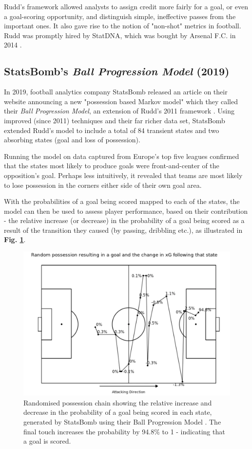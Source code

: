 \documentclass{l4proj}
\begin{document}
Rudd's framework allowed analysts to assign credit more fairly for a goal, or even a goal-scoring opportunity, and distinguish simple, ineffective passes from the important ones. It also gave rise to the notion of "non-shot" metrics in football. Rudd was promptly hired by StatDNA, which was bought by Arsenal F.C. in 2014 \cite{guar1}. 

\subsection{StatsBomb's \textit{Ball Progression Model} (2019)}

In 2019, football analytics company StatsBomb released an article on their website announcing a new "possession based Markov model" which they called their \textit{Ball Progression Model}, an extension of Rudd's 2011 framework \cite{sbomb2}. Using improved (since 2011) techniques and their far richer data set, StatsBomb extended Rudd's model to include a total of 84 transient states and two absorbing states (goal and loss of possession). 

Running the model on data captured from Europe's top five leagues confirmed that the states most likely to produce goals were front-and-center of the opposition's goal. Perhaps less intuitively, it revealed that teams are most likely to lose possession in the corners either side of their own goal area.

With the probabilities of a goal being scored mapped to each of the states, the model can then be used to assess player performance, based on their contribution - the relative increase (or decrease) in the probability of a goal being scored as a result of the transition they caused (by passing, dribbling etc.), as illustrated in \textbf{Fig. \ref{fig:sbbpm}}.

\begin{figure}[h]
    \centering
    \includegraphics[scale=0.4]{images/bpm.png}   
    \caption{Randomised possession chain showing the relative increase and decrease in the probability of a goal being scored in each state, generated by StatsBomb using their Ball Progression Model \cite{sbomb2}. The final touch increases the probability by 94.8\% to 1 - indicating that a goal is scored.}
    \label{fig:sbbpm} 
\end{figure}
\end{document}

